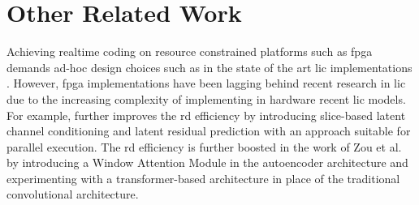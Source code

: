 \section{Other Related Work}
Achieving realtime coding on resource constrained platforms such as \acrshort{fpga} demands ad-hoc design choices such as in the state of the art \acrshort{lic} implementations \cite{9745965, 10494759}. However, \acrshort{fpga} implementations have been lagging behind recent research in \acrshort{lic} due to the increasing complexity of implementing in hardware recent \acrshort{lic} models. For example, \cite{minnen2020channelwiseautoregressiveentropymodels} further improves the \acrshort{rd} efficiency by introducing slice-based latent channel conditioning and latent residual prediction with an approach suitable for parallel execution. The \acrshort{rd} efficiency is further boosted in the work of Zou et al. \cite{zou2022devildetailswindowbasedattention} by introducing a Window Attention Module in the autoencoder architecture and experimenting with a transformer-based architecture in place of the traditional convolutional architecture.